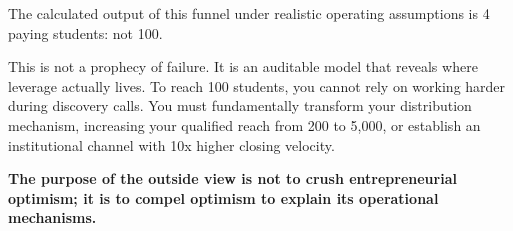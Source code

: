 The calculated output of this funnel under realistic operating assumptions is 4 paying students: not 100.

This is not a prophecy of failure. It is an auditable model that reveals where leverage actually lives. To reach 100 students, you cannot rely on working harder during discovery calls. You must fundamentally transform your distribution mechanism, increasing your qualified reach from 200 to 5,000, or establish an institutional channel with 10x higher closing velocity.

\textbf{The purpose of the outside view is not to crush entrepreneurial optimism; it is to compel optimism to explain its operational mechanisms.}
